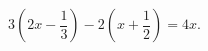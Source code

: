 \begin{ex}[type=equation]
	\begin{condition}
		$3\left(2x -\dfrac{1}{3}\right) - 2\left(x+\dfrac{1}{2}\right) = 4x.$
	\end{condition}
\end{ex}